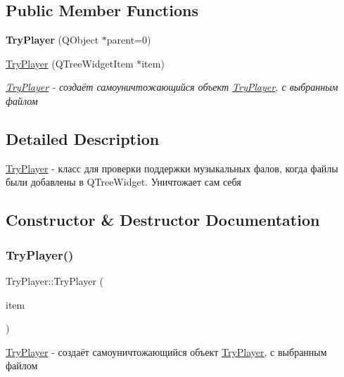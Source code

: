 \subsection*{Public Member Functions}
\begin{DoxyCompactItemize}
\item 
\mbox{\label{class_try_player_a04f52a541353910e794c4605b5c39376}} 
{\bfseries Try\+Player} (Q\+Object $\ast$parent=0)
\item 
\hyperlink{class_try_player_a300f8dd127a92e0b1d1bc8bf75bf979a}{Try\+Player} (Q\+Tree\+Widget\+Item $\ast$item)
\begin{DoxyCompactList}\small\item\em \hyperlink{class_try_player}{Try\+Player} -\/ создаёт самоуничтожающийся объект \hyperlink{class_try_player}{Try\+Player}, с выбранным файлом \end{DoxyCompactList}\end{DoxyCompactItemize}


\subsection{Detailed Description}
\hyperlink{class_try_player}{Try\+Player} -\/ класс для проверки поддержки музыкальных фалов, когда файлы были добавлены в Q\+Tree\+Widget. Уничтожает сам себя 

\subsection{Constructor \& Destructor Documentation}
\mbox{\label{class_try_player_a300f8dd127a92e0b1d1bc8bf75bf979a}} 
\subsubsection{\texorpdfstring{Try\+Player()}{TryPlayer()}}
{\footnotesize\ttfamily Try\+Player\+::\+Try\+Player (\begin{DoxyParamCaption}\item[{Q\+Tree\+Widget\+Item $\ast$}]{item }\end{DoxyParamCaption})}



\hyperlink{class_try_player}{Try\+Player} -\/ создаёт самоуничтожающийся объект \hyperlink{class_try_player}{Try\+Player}, с выбранным файлом 


